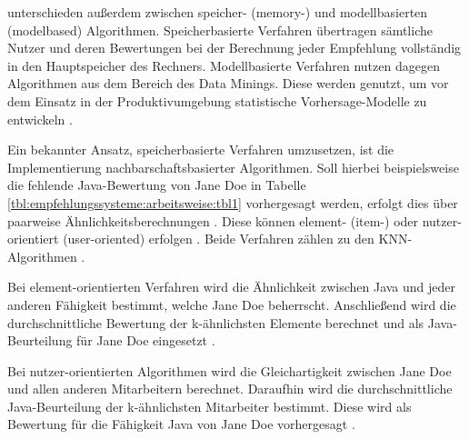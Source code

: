 \textcite[S. 3]{breese:1998} unterschieden außerdem zwischen speicher- (memory-) und modellbasierten (modelbased) Algorithmen. Speicherbasierte Verfahren übertragen sämtliche Nutzer und deren Bewertungen bei der Berechnung jeder Empfehlung vollständig in den Hauptspeicher des Rechners. Modellbasierte Verfahren nutzen dagegen Algorithmen aus dem Bereich des Data Minings. Diese werden genutzt, um vor dem Einsatz in der Produktivumgebung statistische Vorhersage-Modelle zu entwickeln \cite[S. 3]{breese:1998}\cite[S. 11]{schafer:2007}.


Ein bekannter Ansatz, speicherbasierte Verfahren umzusetzen, ist die Implementierung nachbarschaftsbasierter Algorithmen. Soll hierbei beispielsweise die fehlende Java-Bewertung von Jane Doe in Tabelle \ref{tbl:empfehlungssysteme:arbeitsweise:tbl1} vorhergesagt werden, erfolgt dies über paarweise Ähnlichkeitsberechnungen \cite[S. 2f.]{bharti:2019}. Diese können element- (item-) oder nutzer-orientiert (user-oriented) erfolgen \cite[S. 1f.]{duong:2018}. Beide Verfahren zählen zu den \ac{KNN}-Algorithmen \cite[S. 1]{nayak:2018}.

Bei element-orientierten Verfahren wird die Ähnlichkeit zwischen Java und jeder anderen Fähigkeit bestimmt, welche Jane Doe beherrscht. Anschließend wird die durchschnittliche Bewertung der k-ähnlichsten Elemente berechnet und als Java-Beurteilung für Jane Doe eingesetzt \cite[S. 2]{hao:2013}.

Bei nutzer-orientierten Algorithmen wird die Gleichartigkeit zwischen Jane Doe und allen anderen Mitarbeitern berechnet. Daraufhin wird die durchschnittliche Java-Beurteilung der k-ähnlichsten Mitarbeiter bestimmt. Diese wird als Bewertung für die Fähigkeit Java von Jane Doe vorhergesagt \cite[S. 2f.]{hao:2013}.

